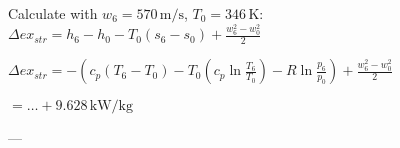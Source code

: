 Calculate with \( w_6 = 570 \, \text{m/s} \), \( T_0 = 346 \, \text{K} \):  
\( \Delta ex_{str} = h_6 - h_0 - T_0 (s_6 - s_0) + \frac{w_6^2 - w_0^2}{2} \)  

\( \Delta ex_{str} = - (c_p (T_6 - T_0) - T_0 (c_p \ln \frac{T_6}{T_0}) - R \ln \frac{p_6}{p_0}) + \frac{w_6^2 - w_0^2}{2} \)  

\( = \dots + 9.628 \, \text{kW/kg} \)  

---